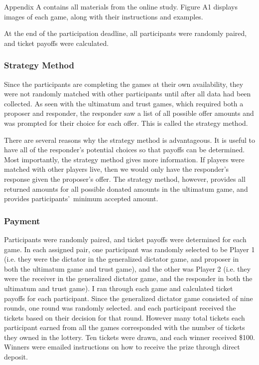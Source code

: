 \documentclass[12pt]{article}
\begin{document}
Appendix A contains all materials from the online study. Figure A1 displays images of each game, along with their instructions and examples.

At the end of the participation deadline, all participants were randomly paired, and ticket payoffs were calculated.

\subsubsection{Strategy Method}

Since the participants are completing the games at their own availability, they were not randomly matched with other participants until after all data had been collected. As seen with the ultimatum and trust games, which required both a proposer and responder, the responder saw a list of all possible offer amounts and was prompted for their choice for each offer. This is called the strategy method.

There are several reasons why the strategy method is advantageous. It is useful to have all of the responder\rq s potential choices so that payoffs can be determined. Most importantly, the strategy method gives more information. If players were matched with other players live, then we would only have the responder\rq s response given the proposer\rq s offer. The strategy method, however, provides all returned amounts for all possible donated amounts in the ultimatum game, and provides participants\rq \ minimum accepted amount. 

\subsubsection{Payment}

Participants were randomly paired, and ticket payoffs were determined for each game. In each assigned pair, one participant was randomly selected to be Player 1 (i.e. they were the dictator in the generalized dictator game, and proposer in both the ultimatum game and trust game), and the other was Player 2 (i.e. they were the receiver in the generalized dictator game, and the responder in both the ultimatum and trust game). I ran through each game and calculated ticket payoffs for each participant. Since the generalized dictator game consisted of nine rounds, one round was randomly selected. and each participant received the tickets based on their decision for that round. However many total tickets each participant earned from all the games corresponded with the number of tickets they owned in the lottery. Ten tickets were drawn, and each winner received \$100. Winners were emailed instructions on how to receive the prize through direct deposit.
\end{document}
